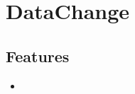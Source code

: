 \section{DataChange}
\label{module:DataChange}
\ClearAPI
\TODO
\subsection{Features}
\begin{itemize}
	\item {}
\end{itemize}
